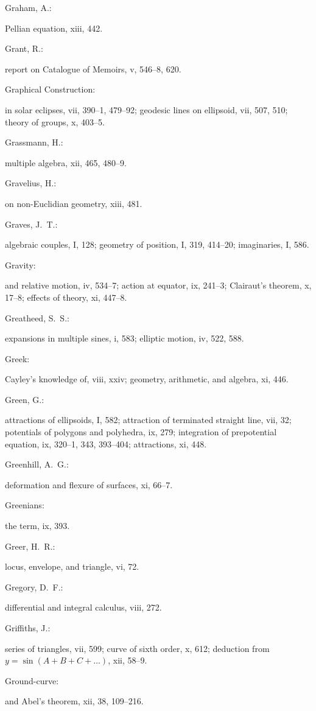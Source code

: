 \documentclass[11pt,a4paper]{book}
\providecommand{\V}[1]{#1}
\providecommand{\IndexEntry}[2]{#1\dotfill #2\par}
\begin{document}
\IndexEntry{Graham, A.}: Pellian equation, \V{xiii}, 442.

\IndexEntry{Grant, R.}: report on Catalogue of Memoirs, \V{v}, 546--8, 620.

\IndexEntry{Graphical Construction}: in solar eclipses, \V{vii}, 390--1, 479--92; geodesic lines on ellipsoid, \V{vii}, 507, 510; theory of groups, \V{x}, 403--5.

\IndexEntry{Grassmann, H.}: multiple algebra, \V{xii}, 465, 480--9.

\IndexEntry{Gravelius, H.}: on non-Euclidian geometry, \V{xiii}, 481.

\IndexEntry{Graves, J.\ T.}: algebraic couples, \V{I}, 128; geometry of position, \V{I}, 319, 414--20; imaginaries, \V{I}, 586.

\IndexEntry{Gravity}: and relative motion, \V{iv}, 534--7; action at equator, \V{ix}, 241--3; Clairaut's theorem, \V{x}, 17--8; effects of theory, \V{xi}, 447--8.

\IndexEntry{Greatheed, S.\ S.}: expansions in multiple sines, \V{i}, 583; elliptic motion, \V{iv}, 522, 588.

\IndexEntry{Greek}: Cayley's knowledge of, \V{viii}, xxiv; geometry, arithmetic, and algebra, \V{xi}, 446.

\IndexEntry{Green, G.}: attractions of ellipsoids, \V{I}, 582; attraction of terminated straight line, \V{vii}, 32; potentials of polygons and polyhedra, \V{ix}, 279; integration of prepotential equation, \V{ix}, 320--1, 343, 393--404; attractions, \V{xi}, 448.

\IndexEntry{Greenhill, A.\ G.}: deformation and flexure of surfaces, \V{xi}, 66--7.

\IndexEntry{Greenians}: the term, \V{ix}, 393.

\IndexEntry{Greer, H.\ R.}: locus, envelope, and triangle, \V{vi}, 72.

\IndexEntry{Gregory, D.\ F.}: differential and integral calculus, \V{viii}, 272.

\IndexEntry{Griffiths, J.}: series of triangles, \V{vii}, 599; curve of sixth order, \V{x}, 612; deduction from $y = \sin(A + B + C + \ldots)$, \V{xii}, 58--9.

\IndexEntry{Ground-curve}: and Abel's theorem, \V{xii}, 38, 109--216.
\end{document}
